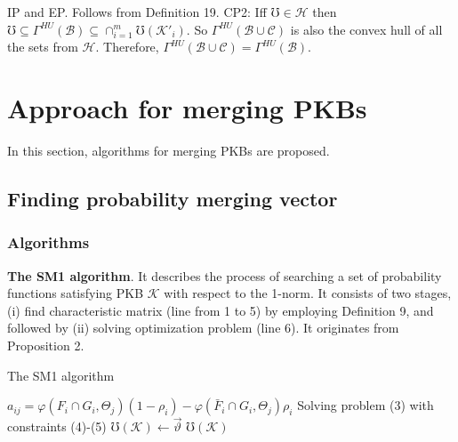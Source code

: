 \documentclass[]{iosart2c}
\begin{document}
    IP and EP. Follows from Definition 19. CP2: Iff $\mho \in
    \mathcal{H}$ then $\mho \subseteq \Gamma^{HU}(\mathcal{B}) \subseteq \cap^m_{i=1}\mho(\mathcal{K}'_i)$. So $\Gamma^{HU}(\mathcal{B} \cup \mathcal{C})$
    is also the convex hull of all the sets from $\mathcal{H}$. Therefore,
    $\Gamma^{HU}(\mathcal{B} \cup \mathcal{C}) = \Gamma^{HU}(\mathcal{B})$.


    \section{Approach for merging PKBs}

    In this section, algorithms for merging PKBs are proposed.

    \subsection{Finding probability merging vector}

    \subsubsection{Algorithms}

    \textbf{The SM1 algorithm}. It describes the process of
    searching a set of probability functions satisfying
    PKB $\mathcal{K}$ with respect to the 1-norm. It consists of two
    stages, (i) find characteristic matrix (line from 1 to 5)
    by employing Definition 9, and followed by (ii) solving
    optimization problem (line 6). It originates from
    Proposition 2.

    \begin{algorithm}
        \caption{The SM1 algorithm}
        \begin{algorithmic}[1]
                    \State $a_{ij} = \varphi(F_i \cap G_i,\Theta_j)(1 - \rho_i) - \varphi(\bar{F}_i \cap G_i,\Theta_j )\rho_i$
                \EndFor
            \EndFor
            \State Solving problem (3) with constraints (4)-(5)
            \State $\mho(\mathcal{K}) \gets \vec{\vartheta}$
            \State \Return $\mho(\mathcal{K})$
        \end{algorithmic}
    \end{algorithm}
\end{document}
